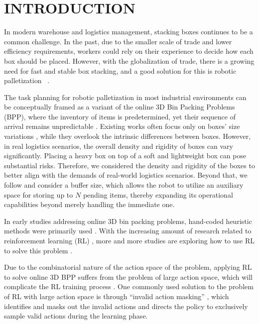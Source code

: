 \section{INTRODUCTION}
\label{section:introduction}

In modern warehouse and logistics management, stacking boxes continues to be a common challenge. In the past, due to the smaller scale of trade and lower efficiency requirements, workers could rely on their experience to decide how each box should be placed. However, with the globalization of trade, there is a growing need for fast and stable box stacking, and a good solution for this is robotic palletization~\cite{lamon2020towards} \cite{szczepanski2022optimal}.

The task planning for robotic palletization in most industrial environments can be conceptually framed as a variant of the online 3D Bin Packing Problems (BPP), where the inventory of items is predetermined, yet their sequence of arrival remains unpredictable \cite{wang2020robot}. 
Existing works often focus only on boxes' size variations \cite{zhao2021online} \cite{zhao2021learning}, while they overlook the intrinsic differences between boxes. However, in real logistics scenarios, the overall density and rigidity of boxes can vary significantly. Placing a heavy box on top of a soft and lightweight box can pose substantial risks. Therefore, we considered the density and rigidity of the boxes to better align with the demands of real-world logistics scenarios.
Beyond that, we follow \cite{wu2024efficient} and consider a buffer size, which allows the robot to utilize an auxiliary space for storing up to $N$ pending items, thereby expanding its operational capabilities beyond merely handling the immediate one.

In early studies addressing online 3D bin packing problems, hand-coded heuristic methods were primarily used \cite{ha2017online} \cite{wang2019stable}. With the increasing amount of research related to reinforcement learning (RL) \cite{kaelbling1996reinforcement}, more and more studies are exploring how to use RL to solve this problem \cite{zhao2021online} \cite{zhao2021learning}  \cite{wu2024efficient}.

Due to the combinatorial nature of the action space of the problem, applying RL to solve online 3D BPP suffers from the problem of large action space, which will complicate the RL training process \cite{dulac2015deep}. One commonly used solution to the problem of RL with large action space is through ``invalid action masking'' \cite{vinyals2017starcraft} \cite{ye2020mastering}, which identifies and masks out the invalid actions and directs the policy to exclusively sample valid actions during the learning phase.

